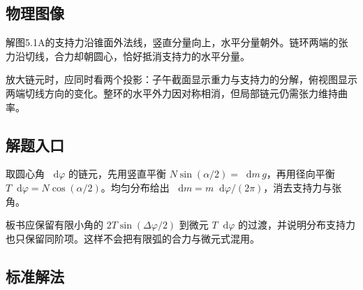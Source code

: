 \documentclass[UTF8,fontset=fandol,a4paper,11pt]{ctexart}
\newcommand{\dd}{\mathop{}\!\mathrm{d}}
\begin{document}


\subsection*{物理图像}

解图5.1A的支持力沿锥面外法线，竖直分量向上，水平分量朝外。链环两端的张力沿切线，合力却朝圆心，恰好抵消支持力的水平分量。

放大链元时，应同时看两个投影：子午截面显示重力与支持力的分解，俯视图显示两端切线方向的变化。整环的水平外力因对称相消，但局部链元仍需张力维持曲率。



\subsection*{解题入口}

取圆心角 $\dd\varphi$ 的链元，先用竖直平衡 $N\sin(\alpha/2)=\dd m\,g$，再用径向平衡 $T\dd\varphi=N\cos(\alpha/2)$。均匀分布给出 $\dd m=m\dd\varphi/(2\pi)$，消去支持力与张角。

板书应保留有限小角的 $2T\sin(\Delta\varphi/2)$ 到微元 $T\dd\varphi$ 的过渡，并说明分布支持力也只保留同阶项。这样不会把有限弧的合力与微元式混用。



\subsection*{标准解法}
\end{document}
